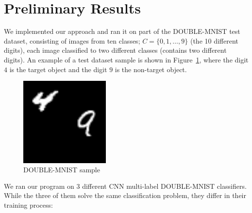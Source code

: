 
\section{Preliminary Results}
We implemented our approach and ran it on part of the DOUBLE-MNIST test dataset, consisting of images from ten classes;
$C = \{0, 1, \ldots,9\}$ (the 10 different digits), each image classified to two different classes (contains two different digits).
An example of a test dataset sample is shown in Figure~\ref{fig:double-mnist-sample}, where the digit $4$ is the target object and the digit $9$ is the non-target object.
\begin{figure}
    \centering
    \includegraphics[width=0.4\textwidth]{3.png}
    \caption{DOUBLE-MNIST sample}
    \label{fig:double-mnist-sample}
\end{figure}

We ran our program on 3 different CNN multi-label DOUBLE-MNIST classifiers.
While the three of them solve the same classification problem, they differ in their training process:

